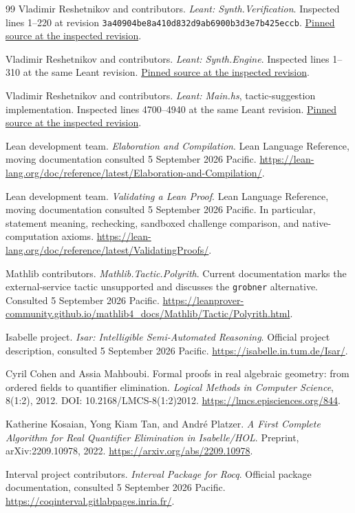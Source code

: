 \documentclass[11pt,letterpaper]{article}
\newcommand{\code}[1]{\nolinkurl{#1}}
\theoremstyle{definition}
\begin{document}
\begin{thebibliography}{99}
Vladimir Reshetnikov and contributors. \emph{Leant: Synth.Verification}.
Inspected lines 1--220 at revision \code{3a40904be8a410d832d9ab6900b3d3e7b425eccb}.
\href{https://github.com/VladimirReshetnikov/Leant/blob/3a40904be8a410d832d9ab6900b3d3e7b425eccb/src/Leant/Synth/Verification.hs}{Pinned source at the inspected revision}.

Vladimir Reshetnikov and contributors. \emph{Leant: Synth.Engine}.
Inspected lines 1--310 at the same Leant revision.
\href{https://github.com/VladimirReshetnikov/Leant/blob/3a40904be8a410d832d9ab6900b3d3e7b425eccb/src/Leant/Synth/Engine.hs}{Pinned source at the inspected revision}.

Vladimir Reshetnikov and contributors. \emph{Leant: Main.hs}, tactic-suggestion
implementation. Inspected lines 4700--4940 at the same Leant revision.
\href{https://github.com/VladimirReshetnikov/Leant/blob/3a40904be8a410d832d9ab6900b3d3e7b425eccb/src/Main.hs}{Pinned source at the inspected revision}.

Lean development team. \emph{Elaboration and Compilation}. Lean Language Reference,
moving documentation consulted 5 September 2026 Pacific.
\url{https://lean-lang.org/doc/reference/latest/Elaboration-and-Compilation/}.

Lean development team. \emph{Validating a Lean Proof}. Lean Language Reference,
moving documentation consulted 5 September 2026 Pacific. In particular, statement
meaning, rechecking, sandboxed challenge comparison, and native-computation axioms.
\url{https://lean-lang.org/doc/reference/latest/ValidatingProofs/}.

Mathlib contributors. \emph{Mathlib.Tactic.Polyrith}. Current documentation marks
the external-service tactic unsupported and discusses the \code{grobner}
alternative. Consulted 5 September 2026 Pacific.
\url{https://leanprover-community.github.io/mathlib4_docs/Mathlib/Tactic/Polyrith.html}.

Isabelle project. \emph{Isar: Intelligible Semi-Automated Reasoning}. Official
project description, consulted 5 September 2026 Pacific.
\url{https://isabelle.in.tum.de/Isar/}.

Cyril Cohen and Assia Mahboubi. Formal proofs in real algebraic geometry: from
ordered fields to quantifier elimination. \emph{Logical Methods in Computer
Science}, 8(1:2), 2012. DOI: 10.2168/LMCS-8(1:2)2012.
\url{https://lmcs.episciences.org/844}.

Katherine Kosaian, Yong Kiam Tan, and Andr\'e Platzer. \emph{A First Complete
Algorithm for Real Quantifier Elimination in Isabelle/HOL}. Preprint,
arXiv:2209.10978, 2022.
\url{https://arxiv.org/abs/2209.10978}.

Interval project contributors. \emph{Interval Package for Rocq}. Official package
documentation, consulted 5 September 2026 Pacific.
\url{https://coqinterval.gitlabpages.inria.fr/}.
\end{thebibliography}
\end{document}
